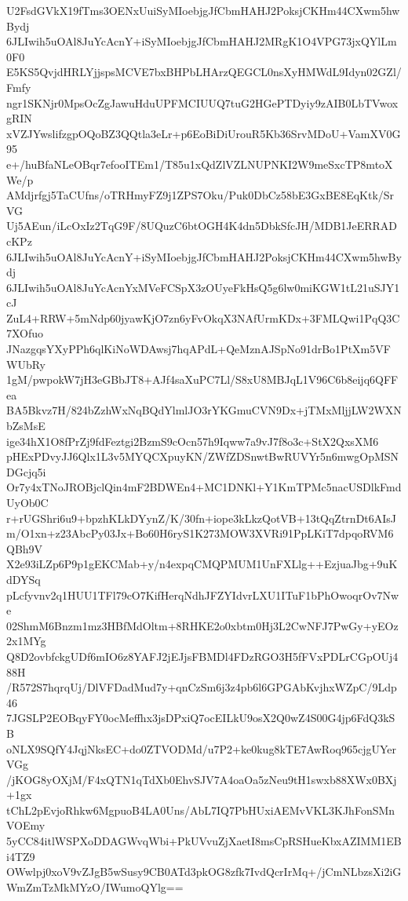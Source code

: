 U2FsdGVkX19fTms3OENxUuiSyMIoebjgJfCbmHAHJ2PoksjCKHm44CXwm5hwBydj
6JLIwih5uOAl8JuYcAcnY+iSyMIoebjgJfCbmHAHJ2MRgK1O4VPG73jxQYlLm0F0
E5KS5QvjdHRLYjjspsMCVE7bxBHPbLHArzQEGCL0nsXyHMWdL9Idyn02GZl/Fmfy
ngr1SKNjr0MpsOcZgJawuHduUPFMCIUUQ7tuG2HGePTDyiy9zAIB0LbTVwoxgRIN
xVZJYwslifzgpOQoBZ3QQtla3eLr+p6EoBiDiUrouR5Kb36SrvMDoU+VamXV0G95
e+/huBfaNLeOBqr7efooITEm1/T85u1xQdZlVZLNUPNKI2W9meSxcTP8mtoXWe/p
AMdjrfgj5TaCUfns/oTRHmyFZ9j1ZPS7Oku/Puk0DbCz58bE3GxBE8EqKtk/SrVG
Uj5AEun/iLcOxIz2TqG9F/8UQuzC6btOGH4K4dn5DbkSfcJH/MDB1JeERRADcKPz
6JLIwih5uOAl8JuYcAcnY+iSyMIoebjgJfCbmHAHJ2PoksjCKHm44CXwm5hwBydj
6JLIwih5uOAl8JuYcAcnYxMVeFCSpX3zOUyeFkHsQ5g6lw0miKGW1tL21uSJY1cJ
ZuL4+RRW+5mNdp60jyawKjO7zn6yFvOkqX3NAfUrmKDx+3FMLQwi1PqQ3C7XOfuo
JNazgqsYXyPPh6qlKiNoWDAwsj7hqAPdL+QeMznAJSpNo91drBo1PtXm5VFWUbRy
1gM/pwpokW7jH3eGBbJT8+AJf4saXuPC7Ll/S8xU8MBJqL1V96C6b8eijq6QFFea
BA5Bkvz7H/824bZzhWxNqBQdYlmlJO3rYKGmuCVN9Dx+jTMxMljjLW2WXNbZsMsE
ige34hX1O8fPrZj9fdFeztgi2BzmS9cOcn57h9Iqww7a9vJ7f8o3c+StX2QxsXM6
pHExPDvyJJ6Qlx1L3v5MYQCXpuyKN/ZWfZDSnwtBwRUVYr5n6mwgOpMSNDGcjq5i
Or7y4xTNoJROBjclQin4mF2BDWEn4+MC1DNKl+Y1KmTPMc5nacUSDlkFmdUyOb0C
r+rUGShri6u9+bpzhKLkDYynZ/K/30fn+iope3kLkzQotVB+13tQqZtrnDt6AIsJ
m/O1xn+z23AbcPy03Jx+Bo60H6ryS1K273MOW3XVRi91PpLKiT7dpqoRVM6QBh9V
X2e93iLZp6P9p1gEKCMab+y/n4expqCMQPMUM1UnFXLlg++EzjuaJbg+9uKdDYSq
pLcfyvnv2q1HUU1TFl79cO7KifHerqNdhJFZYIdvrLXU1ITuF1bPhOwoqrOv7Nwe
02ShmM6Bnzm1mz3HBfMdOltm+8RHKE2o0xbtm0Hj3L2CwNFJ7PwGy+yEOz2x1MYg
Q8D2ovbfckgUDf6mIO6z8YAFJ2jEJjsFBMDl4FDzRGO3H5fFVxPDLrCGpOUj488H
/R572S7hqrqUj/DlVFDadMud7y+qnCzSm6j3z4pb6l6GPGAbKvjhxWZpC/9Ldp46
7JGSLP2EOBqyFY0ocMeffhx3jsDPxiQ7ocEILkU9osX2Q0wZ4S00G4jp6FdQ3kSB
oNLX9SQfY4JqjNksEC+do0ZTVODMd/u7P2+ke0kug8kTE7AwRoq965cjgUYerVGg
/jKOG8yOXjM/F4xQTN1qTdXb0EhvSJV7A4oaOa5zNeu9tH1swxb88XWx0BXj+1gx
tChL2pEvjoRhkw6MgpuoB4LA0Uns/AbL7IQ7PbHUxiAEMvVKL3KJhFonSMnVOEmy
5yCC84itlWSPXoDDAGWvqWbi+PkUVvuZjXaetI8msCpRSHueKbxAZIMM1EBi4TZ9
OWwlpj0xoV9vZJgB5wSusy9CB0ATd3pkOG8zfk7IvdQcrIrMq+/jCmNLbzsXi2iG
WmZmTzMkMYzO/IWumoQYlg==
